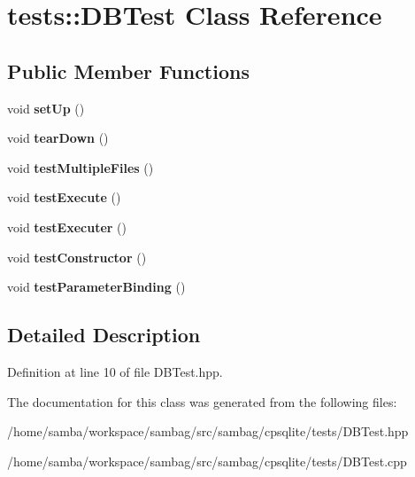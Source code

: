 \hypertarget{classtests_1_1_d_b_test}{
\section{tests::DBTest Class Reference}
\label{classtests_1_1_d_b_test}
}
\subsection*{Public Member Functions}
\begin{DoxyCompactItemize}
\item 
\hypertarget{classtests_1_1_d_b_test_a4bfdb1467c5864401873e578759a55f5}{
void {\bfseries setUp} ()}
\label{classtests_1_1_d_b_test_a4bfdb1467c5864401873e578759a55f5}

\item 
\hypertarget{classtests_1_1_d_b_test_ab763e9ff7b630ef9f35d7d28468b60c9}{
void {\bfseries tearDown} ()}
\label{classtests_1_1_d_b_test_ab763e9ff7b630ef9f35d7d28468b60c9}

\item 
\hypertarget{classtests_1_1_d_b_test_a7f6be8cb5592a09077f8247c8d1399f2}{
void {\bfseries testMultipleFiles} ()}
\label{classtests_1_1_d_b_test_a7f6be8cb5592a09077f8247c8d1399f2}

\item 
\hypertarget{classtests_1_1_d_b_test_aa75de562ee09de028dffc8a50a32d592}{
void {\bfseries testExecute} ()}
\label{classtests_1_1_d_b_test_aa75de562ee09de028dffc8a50a32d592}

\item 
\hypertarget{classtests_1_1_d_b_test_a76bc2cb9db788ac303e9c247f54ff883}{
void {\bfseries testExecuter} ()}
\label{classtests_1_1_d_b_test_a76bc2cb9db788ac303e9c247f54ff883}

\item 
\hypertarget{classtests_1_1_d_b_test_a06b42dbefad46075cf8ad9e9a6efe63c}{
void {\bfseries testConstructor} ()}
\label{classtests_1_1_d_b_test_a06b42dbefad46075cf8ad9e9a6efe63c}

\item 
\hypertarget{classtests_1_1_d_b_test_afcd62d8ae95f074f53fa0967eded7b71}{
void {\bfseries testParameterBinding} ()}
\label{classtests_1_1_d_b_test_afcd62d8ae95f074f53fa0967eded7b71}

\end{DoxyCompactItemize}


\subsection{Detailed Description}


Definition at line 10 of file DBTest.hpp.



The documentation for this class was generated from the following files:\begin{DoxyCompactItemize}
\item 
/home/samba/workspace/sambag/src/sambag/cpsqlite/tests/DBTest.hpp\item 
/home/samba/workspace/sambag/src/sambag/cpsqlite/tests/DBTest.cpp\end{DoxyCompactItemize}
